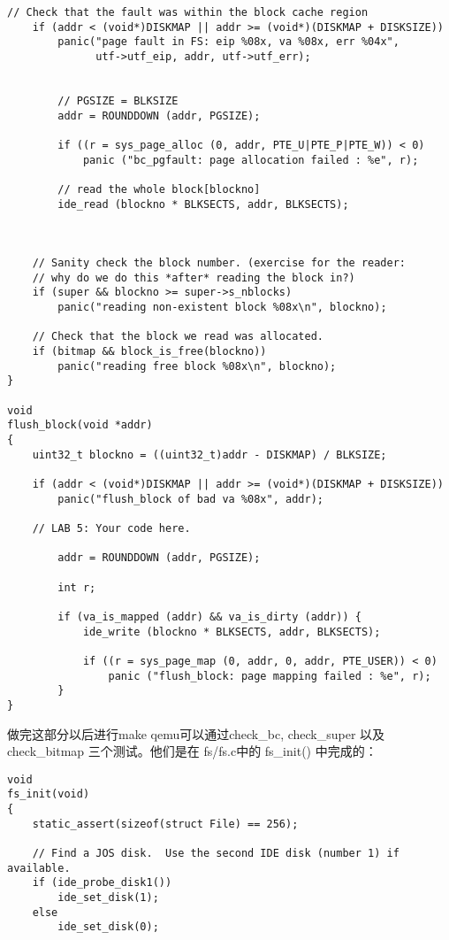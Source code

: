 \documentclass{article}
\newcommand{\funcname}[1]{{\ttfamily \small #1}}
\begin{document}
\begin{CJK*}{UTF8}{gkai}
\begin{lstlisting}[style=ccode, title={\scriptsize \ttfamily \bfseries fc/bc.c}]
	// Check that the fault was within the block cache region
	if (addr < (void*)DISKMAP || addr >= (void*)(DISKMAP + DISKSIZE))
		panic("page fault in FS: eip %08x, va %08x, err %04x",
		      utf->utf_eip, addr, utf->utf_err);

    
        // PGSIZE = BLKSIZE
        addr = ROUNDDOWN (addr, PGSIZE);

        if ((r = sys_page_alloc (0, addr, PTE_U|PTE_P|PTE_W)) < 0)
            panic ("bc_pgfault: page allocation failed : %e", r);

        // read the whole block[blockno]
        ide_read (blockno * BLKSECTS, addr, BLKSECTS);



	// Sanity check the block number. (exercise for the reader:
	// why do we do this *after* reading the block in?)
	if (super && blockno >= super->s_nblocks)
		panic("reading non-existent block %08x\n", blockno);

	// Check that the block we read was allocated.
	if (bitmap && block_is_free(blockno))
		panic("reading free block %08x\n", blockno);
}

void
flush_block(void *addr)
{
	uint32_t blockno = ((uint32_t)addr - DISKMAP) / BLKSIZE;

	if (addr < (void*)DISKMAP || addr >= (void*)(DISKMAP + DISKSIZE))
		panic("flush_block of bad va %08x", addr);

	// LAB 5: Your code here.

        addr = ROUNDDOWN (addr, PGSIZE);

        int r;

        if (va_is_mapped (addr) && va_is_dirty (addr)) {
            ide_write (blockno * BLKSECTS, addr, BLKSECTS);
        
            if ((r = sys_page_map (0, addr, 0, addr, PTE_USER)) < 0)
                panic ("flush_block: page mapping failed : %e", r);
        }
}
\end{lstlisting}

\vspace{2em}

做完这部分以后进行make qemu可以通过check\_bc, check\_super 以及 check\_bitmap 三个测试。他们是在 fs/fs.c中的 \funcname {fs\_init()} 中完成的：

\begin{lstlisting}[style=ccode, title={\scriptsize \ttfamily \bfseries fs/fs.c: fs\_init()}]
void
fs_init(void)
{
	static_assert(sizeof(struct File) == 256);

	// Find a JOS disk.  Use the second IDE disk (number 1) if available.
	if (ide_probe_disk1())
		ide_set_disk(1);
	else
		ide_set_disk(0);
	

\end{lstlisting}
\end{CJK*}
\end{document}
